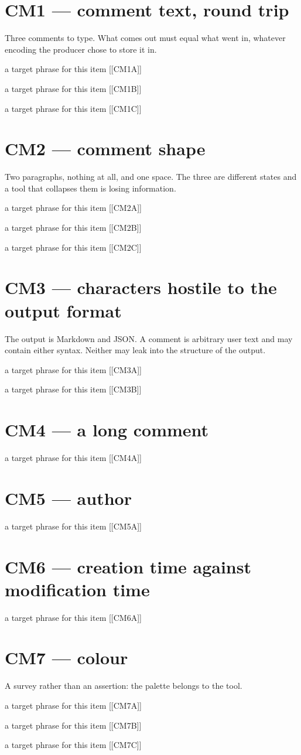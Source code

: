 \documentclass[11pt,a4paper]{article}
\newcommand{\target}[1]{a target phrase for this item [[#1]]\par}
\begin{document}
\section*{CM1 --- comment text, round trip}

Three comments to type. What comes out must equal what went in,
whatever encoding the producer chose to store it in.

\target{CM1A}
\target{CM1B}
\target{CM1C}

\section*{CM2 --- comment shape}

Two paragraphs, nothing at all, and one space. The three are different
states and a tool that collapses them is losing information.

\target{CM2A}
\target{CM2B}
\target{CM2C}

\section*{CM3 --- characters hostile to the output format}

The output is Markdown and JSON. A comment is arbitrary user text and
may contain either syntax. Neither may leak into the structure of the
output.

\target{CM3A}
\target{CM3B}

\section*{CM4 --- a long comment}

\target{CM4A}

\clearpage
\section*{CM5 --- author}

\target{CM5A}

\section*{CM6 --- creation time against modification time}

\target{CM6A}

\section*{CM7 --- colour}

A survey rather than an assertion: the palette belongs to the tool.

\target{CM7A}
\target{CM7B}
\target{CM7C}
\end{document}
